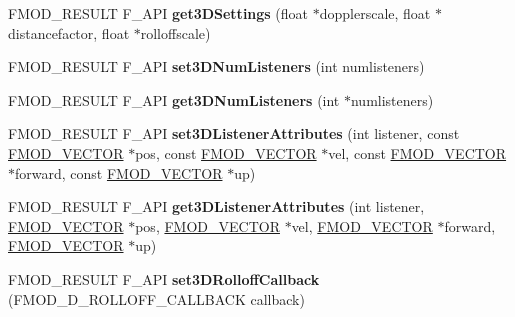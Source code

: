 \begin{DoxyCompactItemize}
\item 
\hypertarget{class_f_m_o_d_1_1_system_a3d437ae627c22704714a274c310b8966}{F\+M\+O\+D\+\_\+\+R\+E\+S\+U\+L\+T F\+\_\+\+A\+P\+I {\bfseries get3\+D\+Settings} (float $\ast$dopplerscale, float $\ast$distancefactor, float $\ast$rolloffscale)}\label{class_f_m_o_d_1_1_system_a3d437ae627c22704714a274c310b8966}

\item 
\hypertarget{class_f_m_o_d_1_1_system_a33a3a5b785baf3eb09a7428ea2beb495}{F\+M\+O\+D\+\_\+\+R\+E\+S\+U\+L\+T F\+\_\+\+A\+P\+I {\bfseries set3\+D\+Num\+Listeners} (int numlisteners)}\label{class_f_m_o_d_1_1_system_a33a3a5b785baf3eb09a7428ea2beb495}

\item 
\hypertarget{class_f_m_o_d_1_1_system_a6909226f2d3f918a3a6900e35476cdbc}{F\+M\+O\+D\+\_\+\+R\+E\+S\+U\+L\+T F\+\_\+\+A\+P\+I {\bfseries get3\+D\+Num\+Listeners} (int $\ast$numlisteners)}\label{class_f_m_o_d_1_1_system_a6909226f2d3f918a3a6900e35476cdbc}

\item 
\hypertarget{class_f_m_o_d_1_1_system_a0e24af3c714aab78000e13cf522a3bfc}{F\+M\+O\+D\+\_\+\+R\+E\+S\+U\+L\+T F\+\_\+\+A\+P\+I {\bfseries set3\+D\+Listener\+Attributes} (int listener, const \hyperlink{struct_f_m_o_d___v_e_c_t_o_r}{F\+M\+O\+D\+\_\+\+V\+E\+C\+T\+O\+R} $\ast$pos, const \hyperlink{struct_f_m_o_d___v_e_c_t_o_r}{F\+M\+O\+D\+\_\+\+V\+E\+C\+T\+O\+R} $\ast$vel, const \hyperlink{struct_f_m_o_d___v_e_c_t_o_r}{F\+M\+O\+D\+\_\+\+V\+E\+C\+T\+O\+R} $\ast$forward, const \hyperlink{struct_f_m_o_d___v_e_c_t_o_r}{F\+M\+O\+D\+\_\+\+V\+E\+C\+T\+O\+R} $\ast$up)}\label{class_f_m_o_d_1_1_system_a0e24af3c714aab78000e13cf522a3bfc}

\item 
\hypertarget{class_f_m_o_d_1_1_system_af141ec87d96230c1c445d6e3c2de224a}{F\+M\+O\+D\+\_\+\+R\+E\+S\+U\+L\+T F\+\_\+\+A\+P\+I {\bfseries get3\+D\+Listener\+Attributes} (int listener, \hyperlink{struct_f_m_o_d___v_e_c_t_o_r}{F\+M\+O\+D\+\_\+\+V\+E\+C\+T\+O\+R} $\ast$pos, \hyperlink{struct_f_m_o_d___v_e_c_t_o_r}{F\+M\+O\+D\+\_\+\+V\+E\+C\+T\+O\+R} $\ast$vel, \hyperlink{struct_f_m_o_d___v_e_c_t_o_r}{F\+M\+O\+D\+\_\+\+V\+E\+C\+T\+O\+R} $\ast$forward, \hyperlink{struct_f_m_o_d___v_e_c_t_o_r}{F\+M\+O\+D\+\_\+\+V\+E\+C\+T\+O\+R} $\ast$up)}\label{class_f_m_o_d_1_1_system_af141ec87d96230c1c445d6e3c2de224a}

\item 
\hypertarget{class_f_m_o_d_1_1_system_a4c1e8040d33a4a1852a31a2ec2e64aa7}{F\+M\+O\+D\+\_\+\+R\+E\+S\+U\+L\+T F\+\_\+\+A\+P\+I {\bfseries set3\+D\+Rolloff\+Callback} (F\+M\+O\+D\+\_\+D\+\_\+\+R\+O\+L\+L\+O\+F\+F\+\_\+\+C\+A\+L\+L\+B\+A\+C\+K callback)}\label{class_f_m_o_d_1_1_system_a4c1e8040d33a4a1852a31a2ec2e64aa7}


\end{DoxyCompactItemize}
